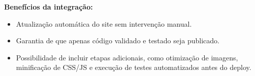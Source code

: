 \textbf{Benefícios da integração:}
\begin{itemize}
    \item Atualização automática do site sem intervenção manual.
    \item Garantia de que apenas código validado e testado seja publicado.
    \item Possibilidade de incluir etapas adicionais, como otimização de imagens, minificação de CSS/JS e execução de testes automatizados antes do deploy.
\end{itemize}
